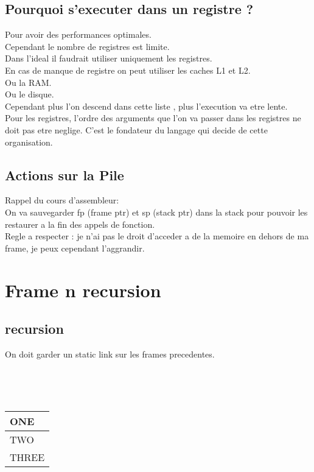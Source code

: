 \documentclass[a4paper,11pt]{article}
\begin{document}
\subsection{Pourquoi s'executer dans un registre ?}

Pour avoir des performances optimales.\\
Cependant le nombre de registres est limite.\\
Dans l'ideal il faudrait utiliser uniquement les registres.\\
En cas de manque de registre on peut utiliser les caches L1 et L2.\\
Ou la RAM.\\
Ou le disque.\\

Cependant plus l'on descend dans cette liste , plus l'execution va etre lente.\\

Pour les registres, l'ordre des arguments que l'on va passer dans les registres ne doit pas etre neglige. C'est le fondateur du langage qui decide de cette organisation.\\

\subsection{Actions sur la Pile}
Rappel du cours d'assembleur:\\
On va sauvegarder fp (frame ptr) et sp (stack ptr) dans la stack pour pouvoir les restaurer a la fin des appels de fonction.\\
Regle a respecter : je n'ai pas le droit d'acceder a de la memoire en dehors de ma frame, je peux cependant l'aggrandir.\\

\section{Frame n recursion}

\subsection{recursion}
On doit garder un static link sur les frames precedentes.

\

\
\begin{tabular}{|l|}
\hline
ONE   \\ \hline
TWO   \\ \hline
THREE \\ \hline
\end{tabular}
\\
\end{document}
